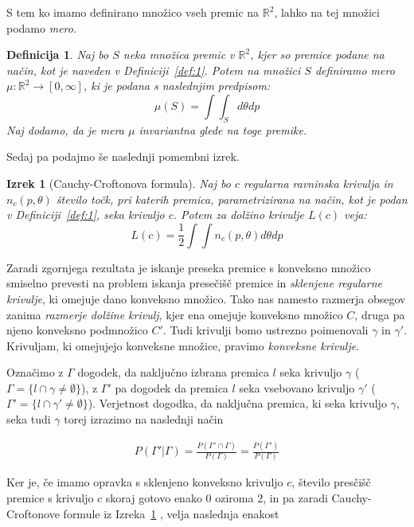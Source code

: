 \documentclass[a4paper]{article}
\newtheorem{definicija}{Definicija}
\newtheorem{izrek}{Izrek}
\begin{document}
S tem ko imamo definirano množico vseh premic na $\mathbb{R}^2$, lahko na tej množici podamo \textit{mero}.

\begin{definicija}
Naj bo $S$ neka množica premic v $\mathbb{R}^2$, kjer so premice podane na način, kot je naveden v Definiciji~\ref{def:1}. Potem na množici $S$ definiramo mero $\mu : \mathbb{R}^2 \rightarrow [0, \infty ]$, ki je podana s naslednjim predpisom: $$ \mu(S) =  \int \int_S  d\theta dp$$Naj dodamo, da je mera $\mu$ invariantna glede na toge premike. 
\end{definicija}

Sedaj pa podajmo še naslednji pomembni izrek.

\begin{izrek}[Cauchy-Croftonova formula]\label{izrek:1}
 Naj bo $c$ regularna ravninska krivulja in $n_c (p, \theta)$  število točk, pri katerih premica, parametrizirana na način, kot je podan v Definiciji~\ref{def:1}, seka krivuljo $c$. Potem za dolžino krivulje $L(c)$ veja: $$L(c) = \frac{1}{2}\int \int n_c (p, \theta) d\theta dp $$ 
 \end{izrek}

\vspace{3 mm}

Zaradi zgornjega rezultata je iskanje preseka premice s konveksno množico smiselno prevesti na problem iskanja presečišč premice in \textit{sklenjene regularne krivulje}, ki omejuje dano konveksno množico. Tako nas namesto razmerja obsegov zanima \textit{razmerje dolžine krivulj}, kjer ena omejuje konveksno množico $C$, druga pa njeno konveksno podmnožico $C'$. Tudi krivulji bomo ustrezno poimenovali $\gamma$ in $\gamma '$. Krivuljam, ki omejujejo konveksne množice, pravimo \textit{konveksne krivulje}. 

Označimo z $\Gamma$ dogodek, da naključno izbrana premica $l$ seka krivuljo $\gamma$ ($\Gamma = \{l \cap \gamma \ne  \emptyset \}$), z $\Gamma'$ pa dogodek da premica $l$ seka vsebovano krivuljo $\gamma'$  ($\Gamma' = \{l \cap \gamma' \ne  \emptyset \}$).  Verjetnost dogodka, da naključna premica, ki seka krivuljo $\gamma$, seka tudi $\gamma$ torej izrazimo na naslednji način

\begin{align}
P(\Gamma' | \Gamma) = \frac{P( \Gamma' \cap  \Gamma)}{P( \Gamma)} = \frac{P( \Gamma')}{P( \Gamma)} \label{eq1}
\end{align}

Ker je, če imamo opravka s sklenjeno konveksno krivuljo $c$, število presčišč premice s krivuljo $c$ skoraj gotovo enako 0 oziroma 2, in pa zaradi Cauchy-Croftonove formule iz Izreka~\ref{izrek:1} , velja naslednja enakost
\end{document}
